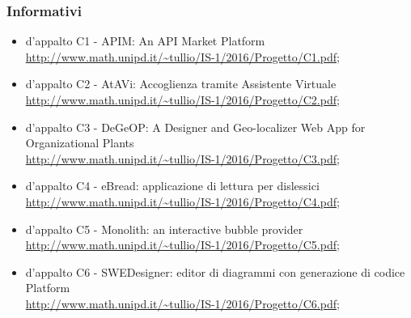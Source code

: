 		\subsubsection {Informativi}
			\begin {itemize}
				\item {} d'appalto C1 - APIM: An API Market Platform \\
					\url {http://www.math.unipd.it/~tullio/IS-1/2016/Progetto/C1.pdf};
				\item {} d'appalto C2 - AtAVi: Accoglienza tramite Assistente Virtuale \\
				\url {http://www.math.unipd.it/~tullio/IS-1/2016/Progetto/C2.pdf};
				\item {} d'appalto C3 - DeGeOP: A Designer and Geo-localizer Web App for Organizational Plants \\
					\url {http://www.math.unipd.it/~tullio/IS-1/2016/Progetto/C3.pdf};
					\item {} d'appalto C4 - eBread: applicazione di lettura per dislessici  \\
					\url {http://www.math.unipd.it/~tullio/IS-1/2016/Progetto/C4.pdf};
					\item {} d'appalto C5 - Monolith: an interactive bubble provider \\
					\url {http://www.math.unipd.it/~tullio/IS-1/2016/Progetto/C5.pdf};
					\item {} d'appalto C6 - SWEDesigner: editor di diagrammi  con generazione di codice Platform \\
					\url {http://www.math.unipd.it/~tullio/IS-1/2016/Progetto/C6.pdf};
					
				
			\end {itemize}
		
		
